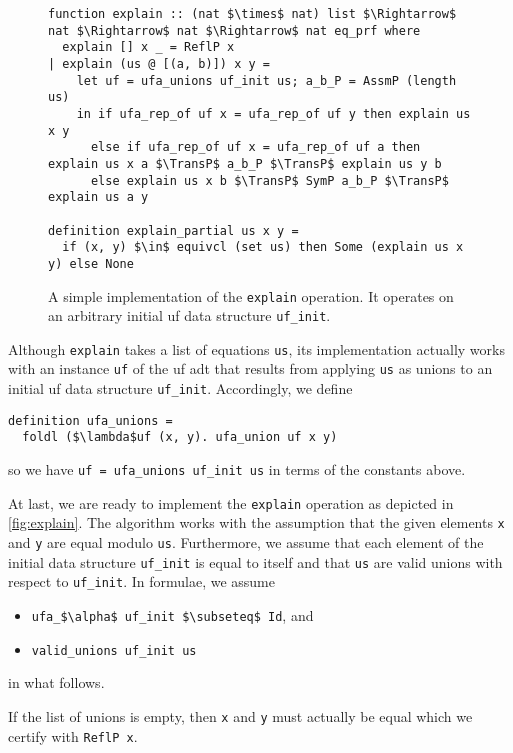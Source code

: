 \documentclass[
  sigplan,
  10pt,
  anonymous,
  review,
  ]{acmart}
\newcommand{\TransP}{\bigtriangledown}
\begin{document}
\begin{figure*}
  \centering
  \begin{lstlisting}
function explain :: (nat $\times$ nat) list $\Rightarrow$ nat $\Rightarrow$ nat $\Rightarrow$ nat eq_prf where
  explain [] x _ = ReflP x
| explain (us @ [(a, b)]) x y =
    let uf = ufa_unions uf_init us; a_b_P = AssmP (length us)
    in if ufa_rep_of uf x = ufa_rep_of uf y then explain us x y
      else if ufa_rep_of uf x = ufa_rep_of uf a then explain us x a $\TransP$ a_b_P $\TransP$ explain us y b
      else explain us x b $\TransP$ SymP a_b_P $\TransP$ explain us a y

definition explain_partial us x y =
  if (x, y) $\in$ equivcl (set us) then Some (explain us x y) else None
  \end{lstlisting}
  \caption{A simple implementation of the \lstinline|explain| operation. It operates on an arbitrary initial \acrshort{uf} data structure \lstinline|uf_init|.\label{fig:explain}}
\end{figure*}
Although \lstinline|explain| takes a list of equations \lstinline|us|, its implementation actually works with an instance \lstinline|uf| of the \acrshort{uf} \acrshort{adt} that results from applying \lstinline|us| as unions to an initial \acrshort{uf} data structure \lstinline|uf_init|.
Accordingly, we define
\begin{lstlisting}
definition ufa_unions =
  foldl ($\lambda$uf (x, y). ufa_union uf x y)
\end{lstlisting}
so we have \lstinline|uf = ufa_unions uf_init us| in terms of the constants above.

At last, we are ready to implement the \lstinline|explain| operation as depicted in \autoref{fig:explain}.
The algorithm works with the assumption that the given elements \lstinline|x| and \lstinline|y| are equal modulo \lstinline|us|.
Furthermore, we assume that each element of the initial data structure \lstinline|uf_init| is equal to itself
and that \lstinline|us| are valid unions with respect to \lstinline|uf_init|.
In formulae, we assume
\begin{itemize}
  \item \lstinline|ufa_$\alpha$ uf_init $\subseteq$ Id|, and
  \item \lstinline|valid_unions uf_init us|
\end{itemize}
in what follows.

If the list of unions is empty, then \lstinline|x| and \lstinline|y| must actually be equal which we certify with \lstinline|ReflP x|.
\end{document}
